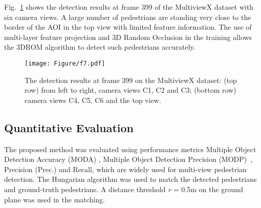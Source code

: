 \documentclass[runningheads]{llncs}
\begin{document}
	Fig.~\ref{f7} shows the detection results at frame 399 of the MultiviewX dataset with six camera views. A large number of pedestrians are standing very close to the border of the AOI in the top view with limited feature information. The use of multi-layer feature projection and 3D Random Occlusion in the training allows the 3DROM algorithm to detect such pedestrians accurately.
	\begin{figure}[t]
		\centering
		\texttt{[image: Figure/f7.pdf]}
\caption{The detection results at frame 399 on the MultiviewX dataset: (top row) from left to right, camera views C1, C2 and C3; (bottom row) camera views C4, C5, C6 and the top view.
}
		\label{f7}
	\end{figure}
	
	\subsection{Quantitative Evaluation}
	The proposed method was evaluated using performance metrics Multiple Object Detection Accuracy (MODA) \cite{kasturi2008framework}, Multiple Object Detection Precision (MODP)~\cite{kasturi2008framework}, Precision (Prec.) and Recall, which are widely used for multi-view pedestrian detection.
The Hungarian algorithm was used to match the detected pedestrians and ground-truth pedestrians. A distance threshold \textit{r} = 0.5m on the ground plane was used in the matching.
	
\end{document}
